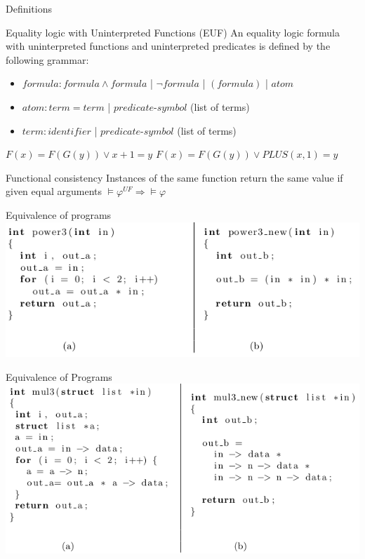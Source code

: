 \documentclass{beamer}
\begin{document}
\begin{frame}{Definitions}
\begin{block}{Equality logic with Uninterpreted Functions (EUF)}
An equality logic formula with uninterpreted functions and uninterpreted predicates is defined by the following grammar:
\begin{itemize}
\item $formula: formula \wedge formula$ | $\lnot formula$ | $(formula)$ | $atom$
\item $atom : term = term$ | $predicate$-$symbol$ (list of terms)
\item $term : identifier$ | $predicate$-$symbol$ (list of terms)
\end{itemize}
\end{block}
$F(x) = F(G(y)) \vee x + 1 = y$\newline
$F(x) = F(G(y)) \vee PLUS(x, 1) = y$\newline
\begin{block}{Functional consistency}
Instances of the same function return the same value if given equal arguments\newline
$\vDash \varphi^{UF} \Rightarrow \vDash \varphi$
\end{block}
\end{frame}

\begin{frame}{Equivalence of programs}
\includegraphics[scale=0.5]{power3.png}
\end{frame}

\begin{frame}{Equivalence of Programs}
\includegraphics[scale=0.5]{mul3.png}
\end{frame}
\end{document}
